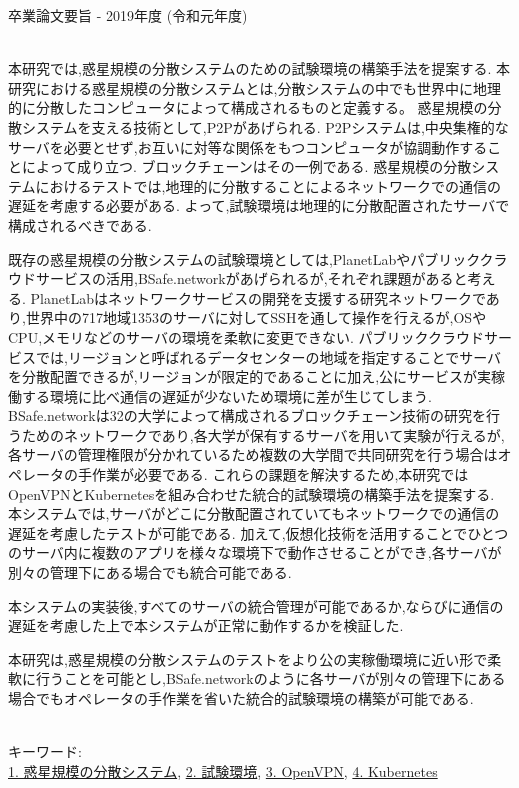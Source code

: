 卒業論文要旨 - 2019年度 (令和元年度)
\begin{center}
\begin{large}
\end{large}
\end{center}

~ \\
本研究では,惑星規模の分散システムのための試験環境の構築手法を提案する.
本研究における惑星規模の分散システムとは,分散システムの中でも世界中に地理的に分散したコンピュータによって構成されるものと定義する。
惑星規模の分散システムを支える技術として,P2Pがあげられる.
P2Pシステムは,中央集権的なサーバを必要とせず,お互いに対等な関係をもつコンピュータが協調動作することによって成り立つ.
ブロックチェーンはその一例である.
惑星規模の分散システムにおけるテストでは,地理的に分散することによるネットワークでの通信の遅延を考慮する必要がある.
よって,試験環境は地理的に分散配置されたサーバで構成されるべきである.

既存の惑星規模の分散システムの試験環境としては,PlanetLabやパブリッククラウドサービスの活用,BSafe.networkがあげられるが,それぞれ課題があると考える.
PlanetLabはネットワークサービスの開発を支援する研究ネットワークであり,世界中の717地域1353のサーバに対してSSHを通して操作を行えるが,OSやCPU,メモリなどのサーバの環境を柔軟に変更できない.
パブリッククラウドサービスでは,リージョンと呼ばれるデータセンターの地域を指定することでサーバを分散配置できるが,リージョンが限定的であることに加え,公にサービスが実稼働する環境に比べ通信の遅延が少ないため環境に差が生じてしまう.
BSafe.networkは32の大学によって構成されるブロックチェーン技術の研究を行うためのネットワークであり,各大学が保有するサーバを用いて実験が行えるが,各サーバの管理権限が分かれているため複数の大学間で共同研究を行う場合はオペレータの手作業が必要である.
これらの課題を解決するため,本研究ではOpenVPNとKubernetesを組み合わせた統合的試験環境の構築手法を提案する.
本システムでは,サーバがどこに分散配置されていてもネットワークでの通信の遅延を考慮したテストが可能である.
加えて,仮想化技術を活用することでひとつのサーバ内に複数のアプリを様々な環境下で動作させることができ,各サーバが別々の管理下にある場合でも統合可能である.

本システムの実装後,すべてのサーバの統合管理が可能であるか,ならびに通信の遅延を考慮した上で本システムが正常に動作するかを検証した.

本研究は,惑星規模の分散システムのテストをより公の実稼働環境に近い形で柔軟に行うことを可能とし,BSafe.networkのように各サーバが別々の管理下にある場合でもオペレータの手作業を省いた統合的試験環境の構築が可能である.

~ \\
キーワード:\\
\underline{1. 惑星規模の分散システム},
\underline{2. 試験環境},
\underline{3. OpenVPN},
\underline{4. Kubernetes}

\begin{flushright}
\dept \\
\author
\end{flushright}
